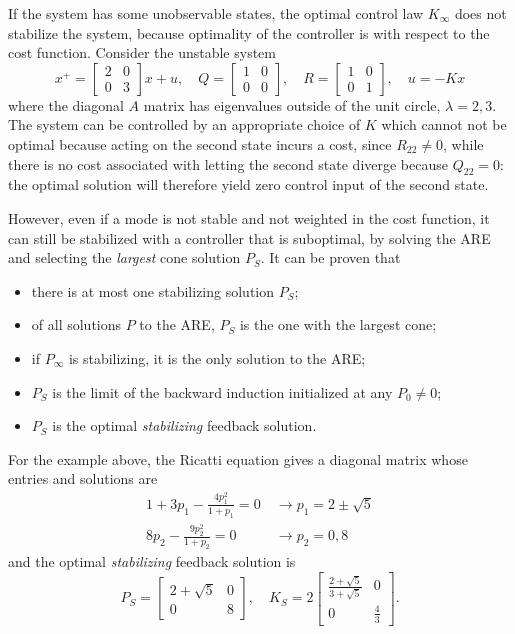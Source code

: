 If the system has some unobservable states, the optimal control law $K_\infty$ does not stabilize the system, because optimality of the controller is with respect to the cost function. Consider the unstable system
\begin{equation*}
  x^+ =
  \begin{bmatrix}
    2 & 0 \\ 0 & 3
  \end{bmatrix}x + u, \quad Q =
  \begin{bmatrix}
    1 & 0 \\ 0 & 0
  \end{bmatrix}, \quad R =
  \begin{bmatrix}
    1 & 0 \\ 0 & 1
  \end{bmatrix},\quad u =-Kx
\end{equation*}
where the diagonal $A$ matrix has eigenvalues outside of the unit circle, $\lambda=2,3$. The system can be controlled by an appropriate choice of $K$ which cannot not be optimal because acting on the second state incurs a cost, since $R_{22}\neq 0$, while there is no cost associated with letting the second state diverge because $Q_{22}=0$: the optimal solution will therefore yield zero control input of the second state.

However, even if a mode is not stable and not weighted in the cost function, it can still be stabilized with a controller that is suboptimal, by solving the ARE and selecting the \emph{largest} cone solution $P_S$. It can be proven that
\begin{itemize}
\item there is at most one stabilizing solution $P_S$;
\item of all solutions $P$ to the ARE, $P_S$ is the one with the largest cone;
\item if $P_\infty$ is stabilizing, it is the only solution to the ARE;
\item $P_S$ is the limit of the backward induction initialized at any $P_0\ne 0$;
\item $P_S$ is the optimal \emph{stabilizing} feedback solution.
\end{itemize}

For the example above, the Ricatti equation gives a diagonal matrix whose entries and solutions are
\begin{align*}
  1 + 3p_1 - \frac{4p_1^2}{1+p_1} = 0\ &\rightarrow p_1 = 2\pm \sqrt{5} \\
  8p_2 - \frac{9p_2^2}{1+p_2} = 0\ &\rightarrow p_2 = 0, 8
\end{align*}
and the optimal \emph{stabilizing} feedback solution is
\begin{equation*}
  P_S =
  \begin{bmatrix}
    2 + \sqrt{5} & 0 \\ 0 & 8
  \end{bmatrix},\quad K_S =
  2\begin{bmatrix}
    \frac{2+\sqrt{5}}{3+\sqrt{5}} & 0 \\ 0 & \frac{4}{3}
  \end{bmatrix}.
\end{equation*}

